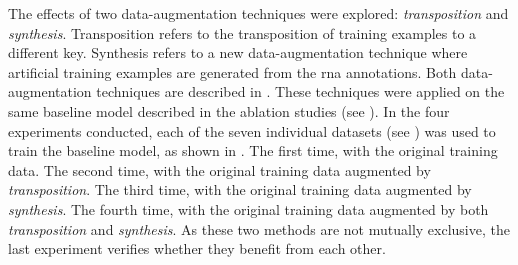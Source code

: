 
The effects of two data-augmentation techniques were
explored: \emph{transposition} and \emph{synthesis}.
Transposition refers to the transposition of training
examples to a different key. Synthesis refers to a new
data-augmentation technique where artificial training
examples are generated from the \gls{rna} annotations. Both
data-augmentation techniques are described in
. These techniques were applied on
the same baseline model described in the ablation studies
(see ). In the four experiments
conducted, each of the seven individual datasets (see
) was used to train the
baseline model, as shown in
. The first time, with the
original training data. The second time, with the original
training data augmented by \emph{transposition}. The third
time, with the original training data augmented by
\emph{synthesis}. The fourth time, with the original
training data augmented by both \emph{transposition} and
\emph{synthesis}. As these two methods are not mutually
exclusive, the last experiment verifies whether they benefit
from each other.




